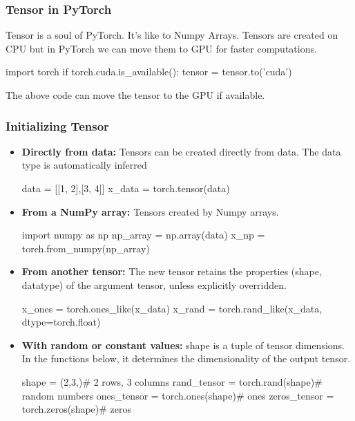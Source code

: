 \documentclass[12pt,hyperref,a4paper,UTF8]{article}
\begin{document}
\subsubsection{Tensor in PyTorch}
\textbf{} Tensor is a soul of PyTorch. It's like to Numpy Arrays. Tensors are created on CPU but in PyTorch we can move them to GPU for faster computations.
\begin{python}
    import torch
    if torch.cuda.is_available():
    tensor = tensor.to('cuda')
\end{python}
The above code can move the tensor to the GPU if available.

\subsubsection{Initializing Tensor}
\begin{itemize}
    \item \textbf{Directly from data:} Tensors can be created directly from data. The data type is automatically inferred
          \begin{python}
              data = [[1, 2],[3, 4]]
              x_data = torch.tensor(data)
          \end{python}
    \item \textbf{From a NumPy array:} Tensors created by Numpy arrays.
          \begin{python}
              import numpy as np
              np_array = np.array(data)
              x_np = torch.from_numpy(np_array)
          \end{python}
    \item \textbf{From another tensor:} The new tensor retains the properties (shape, datatype) of the argument tensor, unless explicitly overridden.
          \begin{python}
              x_ones = torch.ones_like(x_data)
              x_rand = torch.rand_like(x_data, dtype=torch.float)
          \end{python}
    \item \textbf{With random or constant values:} shape is a tuple of tensor dimensions. In the functions below, it determines the dimensionality of the output tensor.
          \begin{python}
              shape = (2,3,)# 2 rows, 3 columns
              rand_tensor = torch.rand(shape)# random numbers
              ones_tensor = torch.ones(shape)# ones
              zeros_tensor = torch.zeros(shape)# zeros
          \end{python}
\end{itemize}
\end{document}
